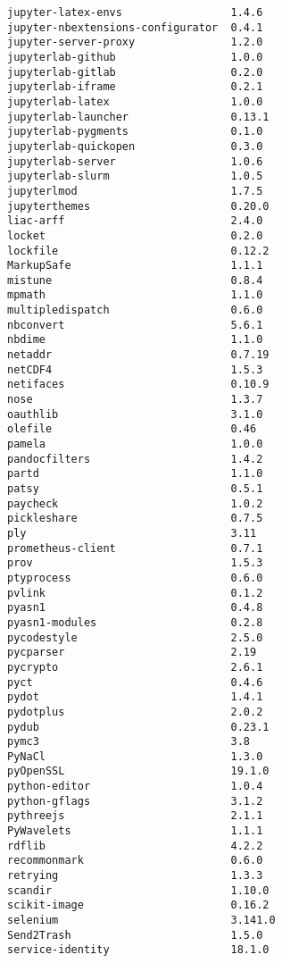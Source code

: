 \documentclass[11pt,a4paper]{article}
\begin{document}
\begin{verbatim}
jupyter-latex-envs                 1.4.6
jupyter-nbextensions-configurator  0.4.1
jupyter-server-proxy               1.2.0
jupyterlab-github                  1.0.0
jupyterlab-gitlab                  0.2.0
jupyterlab-iframe                  0.2.1
jupyterlab-latex                   1.0.0
jupyterlab-launcher                0.13.1
jupyterlab-pygments                0.1.0
jupyterlab-quickopen               0.3.0
jupyterlab-server                  1.0.6
jupyterlab-slurm                   1.0.5
jupyterlmod                        1.7.5
jupyterthemes                      0.20.0
liac-arff                          2.4.0
locket                             0.2.0
lockfile                           0.12.2
MarkupSafe                         1.1.1
mistune                            0.8.4
mpmath                             1.1.0
multipledispatch                   0.6.0
nbconvert                          5.6.1
nbdime                             1.1.0
netaddr                            0.7.19
netCDF4                            1.5.3
netifaces                          0.10.9
nose                               1.3.7
oauthlib                           3.1.0
olefile                            0.46
pamela                             1.0.0
pandocfilters                      1.4.2
partd                              1.1.0
patsy                              0.5.1
paycheck                           1.0.2
pickleshare                        0.7.5
ply                                3.11
prometheus-client                  0.7.1
prov                               1.5.3
ptyprocess                         0.6.0
pvlink                             0.1.2
pyasn1                             0.4.8
pyasn1-modules                     0.2.8
pycodestyle                        2.5.0
pycparser                          2.19
pycrypto                           2.6.1
pyct                               0.4.6
pydot                              1.4.1
pydotplus                          2.0.2
pydub                              0.23.1
pymc3                              3.8
PyNaCl                             1.3.0
pyOpenSSL                          19.1.0
python-editor                      1.0.4
python-gflags                      3.1.2
pythreejs                          2.1.1
PyWavelets                         1.1.1
rdflib                             4.2.2
recommonmark                       0.6.0
retrying                           1.3.3
scandir                            1.10.0
scikit-image                       0.16.2
selenium                           3.141.0
Send2Trash                         1.5.0
service-identity                   18.1.0

\end{verbatim}
\end{document}
